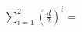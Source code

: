 \documentclass[preview]{standalone}
\begin{document}
\begin{align*}
\sum_{i=1}^2 \left(\frac{d}{2}\right)^i=
\end{align*}
\end{document}
